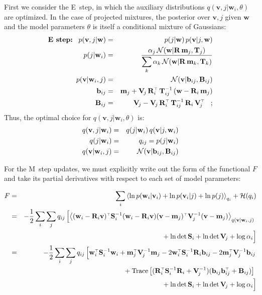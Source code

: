 \documentclass[12pt,preprint]{aastex}
\newcommand{\normal}{{\cal N}}
\renewcommand{\vec}[1]{\mathbf{#1}} %
\newcommand{\inv}{^{-1}}
\newcommand{\bb}{\vec{b}}
\newcommand{\mm}{\vec{m}}
\newcommand{\vv}{\vec{v}}
\newcommand{\ww}{\vec{w}}
\newcommand{\bij}{\bb_{ij}}
\newcommand{\bbij}{\bij}
\newcommand{\mmj}{\mm_j}
\newcommand{\mmk}{\mm_k}
\newcommand{\vvi}{\vv_i}
\newcommand{\wwi}{\ww_i}
\newcommand{\ten}[1]{\mathbf{#1}} %
\newcommand{\BB}{\ten{B}}
\newcommand{\RR}{\ten{R}}
\renewcommand{\SS}{\ten{S}}
\newcommand{\TT}{\ten{T}}
\newcommand{\VV}{\ten{V}}
\newcommand{\BBij}{\BB_{ij}}
\newcommand{\RRi}{\RR_i}
\newcommand{\SSi}{\SS_i}
\newcommand{\VVj}{\VV_{\!j}} %
\newcommand{\TTij}{\TT_{ij}}
\newcommand{\T}{^{\scriptscriptstyle \top}}   %
\newcommand{\alphaj}{\alpha_j}
\newcommand{\alphak}{\alpha_k}
\newcommand{\qij}{q_{ij}}
\newcommand{\qqj}{q_j}
\begin{document}
First we consider the E~step, in which the auxiliary distributions
$q(\vv,j|\wwi,\theta)$ are optimized. In the case of projected
mixtures, the posterior over $\vv,j$ given $\ww$ and the model
parameters $\theta$ is itself a conditional mixture of Gaussians:
\begin{eqnarray}\displaystyle
\mbox{\textbf{E~step:}}\;\;\;
   p(\vv,j|\ww) &=& p(j|\ww)\,p(\vv|j,\ww)\nonumber \\
       p(j|\wwi) &=& \frac{\alphaj\,\normal(\ww|\RR\,\mmj,\TT_j)}
                     {\displaystyle
                     \sum_k \alphak\,\normal(\ww|\RR\,\mmk,\TT_k)}\nonumber \\
   p(\vv|\wwi,j) &=& \normal(\vv|\bij,\BBij)\nonumber \\
            \bij &=& \mmj+\VVj\,\RRi\T\,\TTij\inv\,(\ww-\RRi\,\mmj)\nonumber \\
           \BBij &=& \VVj-\VVj\,\RRi\T\,\TTij\inv\,\RRi\,\VVj\T \;\;\;;
\end{eqnarray}
Thus, the optimal choice for $q(\vv,j|\wwi,\theta)$ is:
\begin{eqnarray}\displaystyle
   q(\vv,j|\wwi) &=& q(j|\wwi)\,q(\vv|j,\wwi)\nonumber \\
   q(j|\wwi) &=& q_{ij} = p(j|\wwi)\nonumber \\
   q(\vv|\wwi,j) &=& \normal(\vv|\bij,\BBij)
\end{eqnarray}

For the M~step updates, we must explicitly write out the form of the
functional $F$ and take its partial derivatives with respect to each
set of model parameters:

\begin{eqnarray}\displaystyle
F &=& \sum_i  \left\langle \ln p(\wwi|\vvi) + \ln p(\vvi|j) + \ln p(j)
  \right\rangle_{q_i} + {\cal H}(q_i) \nonumber \\
&=& -\frac{1}{2} \sum_i \sum_j q_{ij} \left[
\left\langle
(\wwi - \RRi\vv)\T \SSi\inv (\wwi - \RRi\vv)
(\vv - \mmj)\T \VVj\inv (\vv - \mmj)
\right\rangle_{q(\vv|\wwi,j)}
\rule[-1ex]{0ex}{3ex}\right.\nonumber \\  %
&& \quad\quad\quad\quad\quad\quad
\left.\rule[-1ex]{0ex}{3ex}               %
+ \ln \det \SSi  + \ln \det \VVj + \log \alpha_i \right] \nonumber \\
&=& -\frac{1}{2} \sum_i \sum_j q_{ij} \left[
\wwi\T\SSi\inv\wwi +\mmj\T\VVj\inv\mmj
- 2\wwi\T\SSi\inv\RRi\bbij -2\mmj\T\VVj\inv\bbij
\rule[-1ex]{0ex}{3ex}\right.\nonumber \\  %
&& \quad\quad\quad\quad\quad\quad
\left.\rule[-1ex]{0ex}{3ex}               %
+ \mathrm{Trace}\left[ (\RRi\T\SSi\inv\RRi+\VVj\inv)(\bbij\bbij\T +\BBij)\right]
\rule[-1ex]{0ex}{3ex}\right.\nonumber \\  %
&& \quad\quad\quad\quad\quad\quad
\left.\rule[-1ex]{0ex}{3ex}               %
+ \ln \det \SSi + \ln \det \VVj + \log \alpha_i \right]
\end{eqnarray}
\end{document}
